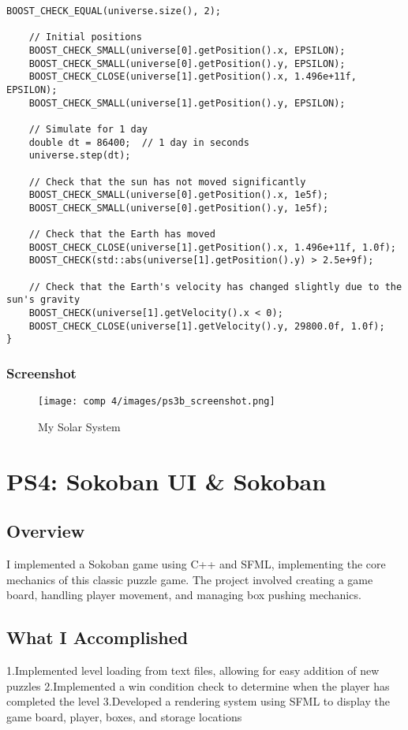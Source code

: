 \documentclass[12pt]{article}
\begin{document}
\begin{lstlisting}[style=cppcode]
    BOOST_CHECK_EQUAL(universe.size(), 2);

    // Initial positions
    BOOST_CHECK_SMALL(universe[0].getPosition().x, EPSILON);
    BOOST_CHECK_SMALL(universe[0].getPosition().y, EPSILON);
    BOOST_CHECK_CLOSE(universe[1].getPosition().x, 1.496e+11f, EPSILON);
    BOOST_CHECK_SMALL(universe[1].getPosition().y, EPSILON);

    // Simulate for 1 day
    double dt = 86400;  // 1 day in seconds
    universe.step(dt);

    // Check that the sun has not moved significantly
    BOOST_CHECK_SMALL(universe[0].getPosition().x, 1e5f);
    BOOST_CHECK_SMALL(universe[0].getPosition().y, 1e5f);

    // Check that the Earth has moved
    BOOST_CHECK_CLOSE(universe[1].getPosition().x, 1.496e+11f, 1.0f);
    BOOST_CHECK(std::abs(universe[1].getPosition().y) > 2.5e+9f);

    // Check that the Earth's velocity has changed slightly due to the sun's gravity
    BOOST_CHECK(universe[1].getVelocity().x < 0);
    BOOST_CHECK_CLOSE(universe[1].getVelocity().y, 29800.0f, 1.0f);
}

\end{lstlisting}
\newpage
\subsubsection{Screenshot}
\begin{figure}[tbh]
	\centering
	\texttt{[image: comp 4/images/ps3b\_screenshot.png]}
	\caption{My Solar System}
\end{figure}
\newpage
\section{PS4: Sokoban UI \& Sokoban}
\subsection{Overview}
I implemented a Sokoban game using C++ and SFML, implementing the core mechanics of this classic puzzle game. The project involved creating a game board, handling player movement, and managing box pushing mechanics.
\subsection{What I Accomplished}
1.Implemented level loading from text files, allowing for easy addition of new puzzles
\newline
2.Implemented a win condition check to determine when the player has completed the level
\newline
3.Developed a rendering system using SFML to display the game board, player, boxes, and storage locations
\end{document}
